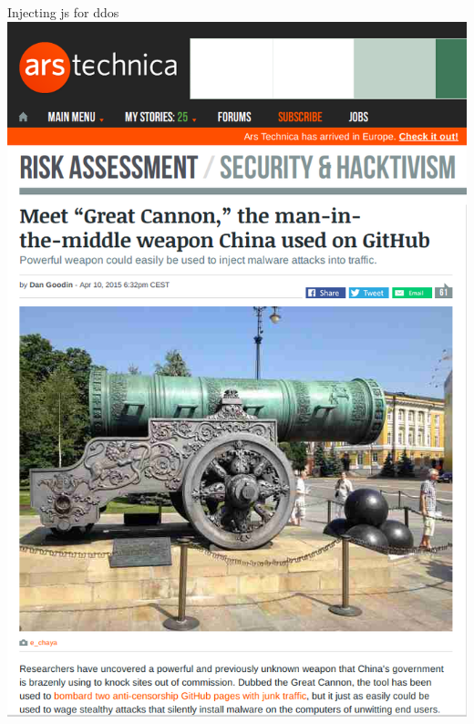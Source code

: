 \documentclass[11pt]{beamer}
\begin{document}
\begin{frame}{Injecting js for ddos}
\includegraphics[scale=0.2]{great_canon.png}
\end{frame}
\end{document}
